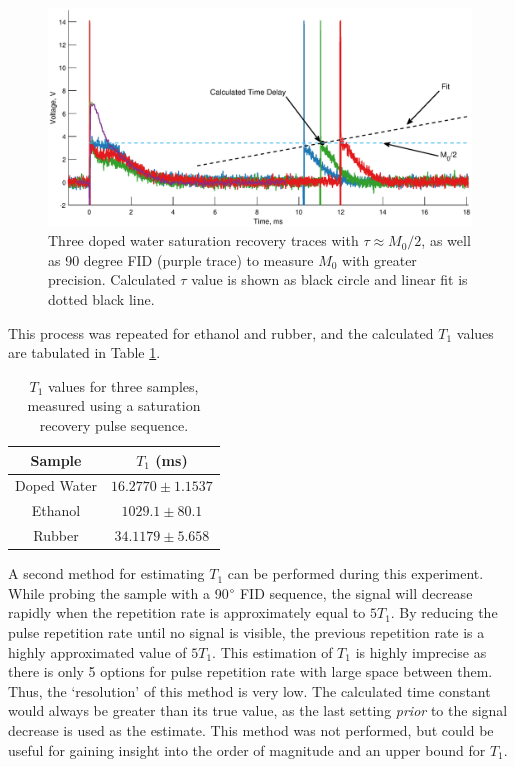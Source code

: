 \begin{figure}[H]
    \centering
    \includegraphics[width=\textwidth]{figures/B3/B3_2.eps}
    \caption{Three doped water saturation recovery traces with $\tau \approx M_0/2$, as well as 90 degree FID (purple trace) to measure $M_0$ with greater precision. Calculated $\tau$ value is shown as black circle and linear fit is dotted black line.}
    \label{fig:B3:example_uncertainty}
\end{figure}

This process was repeated for ethanol and rubber, and the calculated $T_1$ values are tabulated in Table \ref{tab:B3:T1values}.

\begin{table}[H]
    \centering
    \begin{tabular}{c|c}
    \toprule
        \textbf{Sample} & $T_1$ (ms) \\ \midrule
        {Doped Water} & $16.2770  \pm  1.1537$ \\
        {Ethanol} & $1029.1 \pm 80.1$  \\
        {Rubber} & $34.1179 \pm 5.658$ \\ \bottomrule
    \end{tabular}
    \caption{$T_1$ values for three samples, measured using a saturation recovery pulse sequence.}
    \label{tab:B3:T1values}
\end{table}

A second method for estimating $T_1$ can be performed during this experiment. While probing the sample with a 90$\degree$ FID sequence, the signal will decrease rapidly when the repetition rate is approximately equal to $5T_1$. By reducing the pulse repetition rate until no signal is visible, the previous repetition rate is a highly approximated value of $5T_1$. This estimation of $T_1$ is highly imprecise as there is only 5 options for pulse repetition rate with large space between them. Thus, the `resolution' of this method is very low. The calculated time constant would always be greater than its true value, as the last setting \textit{prior} to the signal decrease is used as the estimate. This method was not performed, but could be useful for gaining insight into the order of magnitude and an upper bound for $T_1$.  \\

